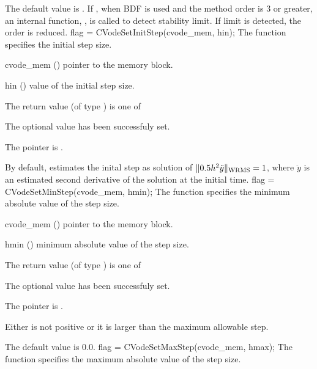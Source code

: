 {
  The default value is . If , when BDF is used
  and the method order is 3 or greater, an internal function, ,
  is called to detect stability limit. If limit is detected, the order is reduced.
}
{
flag = CVodeSetInitStep(cvode\_mem, hin);
}
{
  The function  specifies the initial step size.
}
{
  \begin{args}
  \item[cvode\_mem] ()
    pointer to the {\cvodes} memory block.
  \item[hin] ()
    value of the initial step size.
  \end{args}
}
{
  The return value  (of type ) is one of
  \begin{args}
  \item[\Id{SUCCESS}] 
    The optional value has been successfuly set.
  \item[\Id{CVS\_NO\_MEM}]
    The  pointer is .
  \end{args}
}
{
  By default, {\cvodes} estimates the inital step as solution of 
  $\| 0.5 h^2 \ddot y \|_{\mbox{\scriptsize WRMS}} = 1$,
  where $\ddot y$ is an estimated second derivative of the solution at the
  initial time.
}
{
flag = CVodeSetMinStep(cvode\_mem, hmin);
}
{
  The function  specifies the minimum absolute
  value of the step size.
}
{
  \begin{args}
  \item[cvode\_mem] ()
    pointer to the {\cvodes} memory block.
  \item[hmin] ()
    minimum absolute value of the step size.
  \end{args}
}
{
  The return value  (of type ) is one of
  \begin{args}
  \item[\Id{SUCCESS}] 
    The optional value has been successfuly set.
  \item[\Id{CVS\_NO\_MEM}]
    The  pointer is .
  \item[\Id{CVS\_ILL\_INPUT}]
    Either  is not positive or it is larger than the maximum allowable step.
  \end{args}
}
{
  The default value is $0.0$.
}
{
flag = CVodeSetMaxStep(cvode\_mem, hmax);
}
{
  The function  specifies the maximum absolute
  value of the step size.
}
